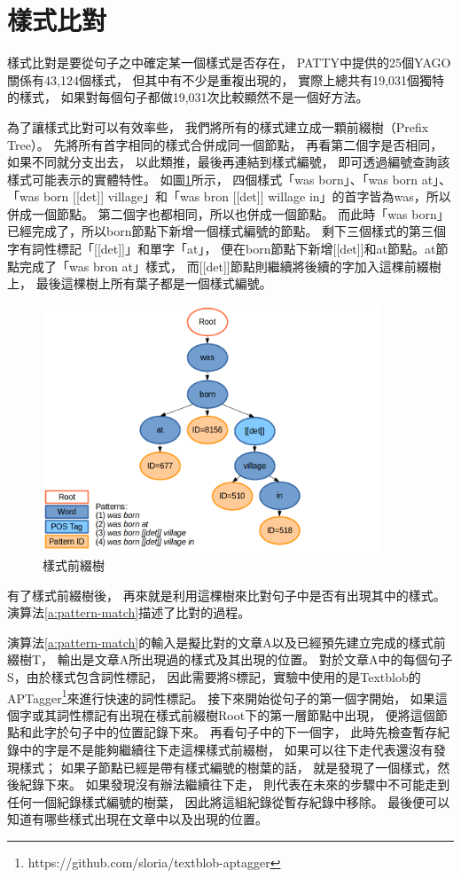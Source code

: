 \section{樣式比對}
\label{s:pattern-match}

樣式比對是要從句子之中確定某一個樣式是否存在，
PATTY中提供的25個YAGO關係有43,124個樣式，
但其中有不少是重複出現的，
實際上總共有19,031個獨特的樣式，
如果對每個句子都做19,031次比較顯然不是一個好方法。

為了讓樣式比對可以有效率些，
我們將所有的樣式建立成一顆前綴樹（Prefix Tree）。
先將所有首字相同的樣式合併成同一個節點，
再看第二個字是否相同，如果不同就分支出去，
以此類推，最後再連結到樣式編號，
即可透過編號查詢該樣式可能表示的實體特性。
如圖\ref{i:pattern-prefix-tree}所示，
四個樣式「was born」、「was born at」、「was born [[det]] village」和「was bron [[det]] willage in」的首字皆為was，所以併成一個節點。
第二個字也都相同，所以也併成一個節點。
而此時「was born」已經完成了，所以born節點下新增一個樣式編號的節點。
剩下三個樣式的第三個字有詞性標記「[[det]]」和單字「at」，
便在born節點下新增[[det]]和at節點。at節點完成了「was bron at」樣式，
而[[det]]節點則繼續將後續的字加入這棵前綴樹上，
最後這棵樹上所有葉子都是一個樣式編號。

\begin{figure}
    \centering
    \includegraphics[width=0.9\textwidth]{images/03-pattern-prefix-tree}
    \caption{樣式前綴樹}
    \label{i:pattern-prefix-tree}
\end{figure}

有了樣式前綴樹後，
再來就是利用這棵樹來比對句子中是否有出現其中的樣式。
演算法\ref{a:pattern-match}描述了比對的過程。

演算法\ref{a:pattern-match}的輸入是擬比對的文章A以及已經預先建立完成的樣式前綴樹T，
輸出是文章A所出現過的樣式及其出現的位置。
對於文章A中的每個句子S，由於樣式包含詞性標記，
因此需要將S標記，實驗中使用的是Textblob的APTagger\footnote{https://github.com/sloria/textblob-aptagger}來進行快速的詞性標記。
接下來開始從句子的第一個字開始，
如果這個字或其詞性標記有出現在樣式前綴樹Root下的第一層節點中出現，
便將這個節點和此字於句子中的位置記錄下來。
再看句子中的下一個字，
此時先檢查暫存紀錄中的字是不是能夠繼續往下走這棵樣式前綴樹，
如果可以往下走代表還沒有發現樣式；
如果子節點已經是帶有樣式編號的樹葉的話，
就是發現了一個樣式，然後紀錄下來。
如果發現沒有辦法繼續往下走，
則代表在未來的步驟中不可能走到任何一個紀錄樣式編號的樹葉，
因此將這組紀錄從暫存紀錄中移除。
最後便可以知道有哪些樣式出現在文章中以及出現的位置。

